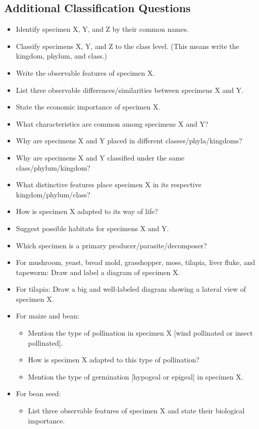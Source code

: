 \subsection{Additional Classification Questions}
\begin{itemize}
\item{Identify specimen X, Y, and Z by their common names.}
\item{Classify specimens X, Y, and Z to the class level. (This means write the kingdom, phylum, and class.)}
\item{Write the observable features of specimen X.}
\item{List three observable differences\slash similarities between specimens X and Y.}
\item{State the economic importance of specimen X.}
\item{What characteristics are common among specimens X and Y?}
\item{Why are specimens X and Y placed in different classes\slash phyla\slash kingdoms?}
\item{Why are specimens X and Y classified under the same class\slash phylum\slash kingdom?}
\item{What distinctive features place specimen X in its respective kingdom\slash phylum\slash class?}
\item{How is specimen X adapted to its way of life?}
\item{Suggest possible habitats for specimens X and Y.}
\item{Which specimen is a primary producer\slash parasite\slash decomposer?}
\item{For mushroom, yeast, bread mold, grasshopper, moss, tilapia, liver fluke, and tapeworm: Draw and label a diagram of specimen X.}
\item{For tilapia: Draw a big and well-labeled diagram showing a lateral view of specimen X.}
\item{For maize and bean:}
\begin{itemize}
\item{Mention the type of pollination in specimen X [wind pollinated or insect pollinated].}
\item{How is specimen X adapted to this type of pollination?}
\item{Mention the type of germination [hypogeal or epigeal] in specimen X.}
\end{itemize}
\item{For bean seed:}
\begin{itemize}
\item{List three observable features of specimen X and state their biological importance.}

\end{itemize}
\end{itemize}
